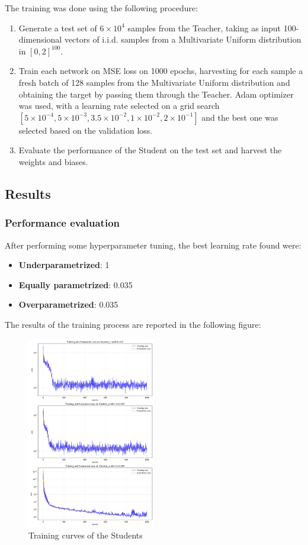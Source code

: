 \documentclass[a4paper, 10pt]{article}
\begin{document}
The training was done using the following procedure:
\begin{enumerate}
    \item Generate a test set of $6 \times 10^4$ samples from the Teacher, taking as input 100-dimensional vectors of i.i.d. samples from a Multivariate
    Uniform distribution in $[0, 2]^{100}$.
    \item Train each network on MSE loss on 1000 epochs, harvesting for each sample a fresh batch of 128 samples from the Multivariate Uniform distribution and
    obtaining the target by passing them through the Teacher. Adam optimizer was used, with a learning rate selected on a grid search $[5 \times 10^{-4}, 5\times 10 ^{-3}, 3.5\times 10^{-2}, 1\times 10^{-2}, 2\times10^{-1}]$
    and the best one was selected based on the validation loss.
    \item Evaluate the performance of the Student on the test set and harvest the weights and biases.
\end{enumerate}

\subsection{Results}
\subsubsection{Performance evaluation}
After performing some hyperparameter tuning, the best learning rate found were:
\begin{itemize}
    \item \textbf{Underparametrized}: 1
    \item \textbf{Equally parametrized}: 0.035
    \item \textbf{Overparametrized}: 0.035
\end{itemize}

The results of the training process are reported in the following figure:
\begin{figure}[h]
    \centering
    \includegraphics[width=0.5\textwidth]{images/training_curves_exA.png}
    \caption{Training curves of the Students}
    \label{fig:training_curves_exA}
\end{figure}
\end{document}
